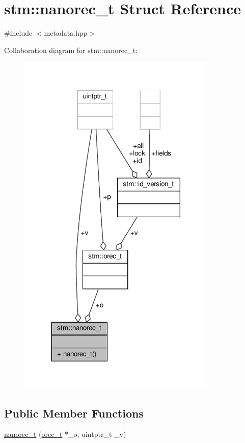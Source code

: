 \hypertarget{structstm_1_1nanorec__t}{\section{stm\-:\-:nanorec\-\_\-t Struct Reference}
\label{structstm_1_1nanorec__t}
}


{\ttfamily \#include $<$metadata.\-hpp$>$}



Collaboration diagram for stm\-:\-:nanorec\-\_\-t\-:
\nopagebreak
\begin{figure}[H]
\begin{center}
\leavevmode
\includegraphics[width=269pt]{structstm_1_1nanorec__t__coll__graph}
\end{center}
\end{figure}
\subsection*{Public Member Functions}
\begin{DoxyCompactItemize}
\item 
\hyperlink{structstm_1_1nanorec__t_ac2eced4973b48ea1f69cbac514bfd411}{nanorec\-\_\-t} (\hyperlink{structstm_1_1orec__t}{orec\-\_\-t} $\ast$\-\_\-o, uintptr\-\_\-t \-\_\-v)
\end{DoxyCompactItemize}
